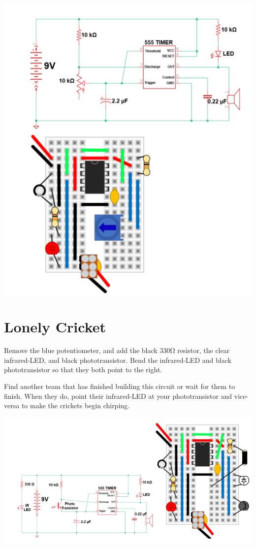 \documentclass[
]{book}
\begin{document}
\includegraphics[width=6.81in]{images/cricket_diagram}

\hypertarget{lonely-cricket}{%
\chapter{Lonely Cricket}\label{lonely-cricket}}

Remove the blue potentiometer, and add the black 330Ω resistor, the clear infrared-LED, and black phototransistor. Bend the infrared-LED and black phototransistor so that they both point to the right.

Find another team that has finished building this circuit or wait for them to finish. When they do, point their infrared-LED at your phototransistor and vice-versa to make the crickets begin chirping.

\includegraphics[width=9.04in]{images/lonely_cricket_diagram}

  
\end{document}
